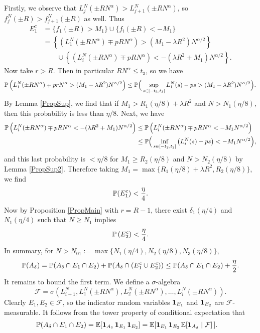 	Firstly, we observe that $L_j^N(\pm RN^\alpha)> L_{j+1}^N(\pm RN^\alpha)$, so $f_j^N(\pm R)>f_{j+1}^N(\pm R)$ as well. Thus
	\begin{align*}
	E_1^c &= \{f_1(\pm R)> M_1\} \cup \{f_i(\pm R)<-M_1\} \\
	&= \left\{ \left(L_1^N(\pm RN^\alpha)\mp pRN^\alpha\right)> (M_1-\lambda R^2)N^{\alpha/2}\right\}\\
	&\qquad \cup \left\{\left(L_i^N(\pm RN^\alpha)\mp pRN^\alpha\right)< -(\lambda R^2+M_1)N^{\alpha/2}\right\}.
	\end{align*}
	Now take $r>R$. Then in particular $RN^\alpha \leq t_3$, so we have $$
	\mathbb{P}\left(L_1^N(\pm RN^\alpha)\mp prN^\alpha>(M_1-\lambda R^2)N^{\alpha/2}\right)
	\leq\mathbb{P}\Big(\sup_{s\in[-t_3,t_3]}L_1^N(s)-ps>(M_1-\lambda R^2)N^{\alpha/2}\Big).
	$$ By Lemma \ref{PropSup}, we find that if $M_1>R_1(\eta/8)+\lambda R^2$ and $N>N_1(\eta/8)$, then this probability is less than $\eta/8$. Next, we have
	\begin{align*}
	\mathbb{P} \left(L_i^N(\pm RN^\alpha)\mp pRN^\alpha< -(\lambda R^2+M_1)N^{\alpha/2}\right)&\leq \mathbb{P} \left(L_i^N(\pm RN^\alpha)\mp pRN^\alpha< -M_1N^{\alpha/2}\right)\\
	&\leq \mathbb{P}\Big(\inf_{s\in[-t_2,t_2]}\big(L_i^N(s)-ps\big)<-M_1N^{\alpha/2}\Big),
	\end{align*}
	and this last probability is $<\eta/8$ for $M_1\geq R_2(\eta/8)$ and $N>N_2(\eta/8)$ by Lemma \ref{PropSup2}. Therefore taking $M_1=\max\{R_1(\eta/8)+\lambda R^2,R_2(\eta/8)\}$, we find $$\mathbb{P}(E_1^c)<\frac{\eta}{4}.$$
	Now by Proposition \ref{PropMain} with $r=R-1$, there exist $\delta_1(\eta/4)$ and $N_1(\eta/4)$ such that $N\geq N_1$ implies 
	\[
	\mathbb{P}\left( E_2^c\right)<\frac{\eta}{4}.
	\]
	In summary, for $N>N_{01} := \max\{N_1(\eta/4),N_2(\eta/8),N_3(\eta/8)\}$, 
	\begin{equation}
	\mathbb{P}(A_\delta)= \mathbb{P}(A_\delta\cap E_1\cap E_2)+\mathbb{P}(A_\delta\cap\left(E_1^c\cup E_2^c\right))\leq \mathbb{P}(A_\delta\cap E_1\cap E_2)+\frac{\eta}{2}. \label{ThmBias}
	\end{equation}
	It remains to bound the first term. We define a $\sigma$-algebra 
	$$\mathcal{F}=\sigma\left(L_{i+1}^N,L_1^N(\pm RN^\alpha ), L_2^N(\pm RN^\alpha ),\dots, L_i^N(\pm RN^\alpha )\right).$$
	Clearly $E_1, E_2\in \mathcal{F}$, so the indicator random variables $\operatorname{\mathbf{1}}_{E_1}$ and $\operatorname{\mathbf{1}}_{E_2}$ are $\mathcal{F}$-measurable. It follows from the tower property of conditional expectation that
	\begin{align}
	\mathbb{P}(A_\delta\cap E_1\cap E_2)&=\mathbb{E}[\operatorname{\mathbf{1}}_{A_\delta} \operatorname{\mathbf{1}}_{E_1} \operatorname{\mathbf{1}}_{E_2}] =\mathbb{E}[\operatorname{\mathbf{1}}_{E_1} \operatorname{\mathbf{1}}_{E_2}\mathbb{E}[\operatorname{\mathbf{1}}_{A_\delta}\mid \mathcal{F}]\,]. \label{tower}
	\end{align}
